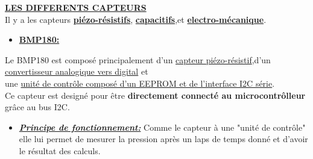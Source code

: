 \documentclass[a4paper,12pt]{report}
\begin{document}
\underline{\textbf{LES DIFFERENTS CAPTEURS}}\\ \break
\setlength{\indent}
Il y a les capteurs \underline{\textbf{piézo-résistifs}}, \underline{\textbf{capacitifs}},et \underline{\textbf{electro-mécanique}}.  

\hfill

\begin{itemize} 
\setlength{\itemindent}{1cm}
 \item \underline{\textbf{BMP180:}}
\end{itemize}

\setlength{\itemindent}{3cm}

Le BMP180 est composé principalement d'un \underline{capteur piézo-résistif},d'un \underline{convertisseur analogique vers digital} 
et \\ une \underline{unité de contrôle composé d'un EEPROM et de l'interface I2C série}.\\

Ce capteur est designé pour être \textbf{directement connecté au microcontrôlleur} grâce au bus I2C. 

\begin{itemize}

\setlength{\itemindent}{2cm}
\item \underline{\textit{\textbf{Principe de fonctionnement:}}} Comme le capteur à une "unité de
 contrôle" elle lui permet de mesurer la pression après un laps de temps donné et d'avoir le résultat des calculs.    
\end{itemize} 
\end{document}
